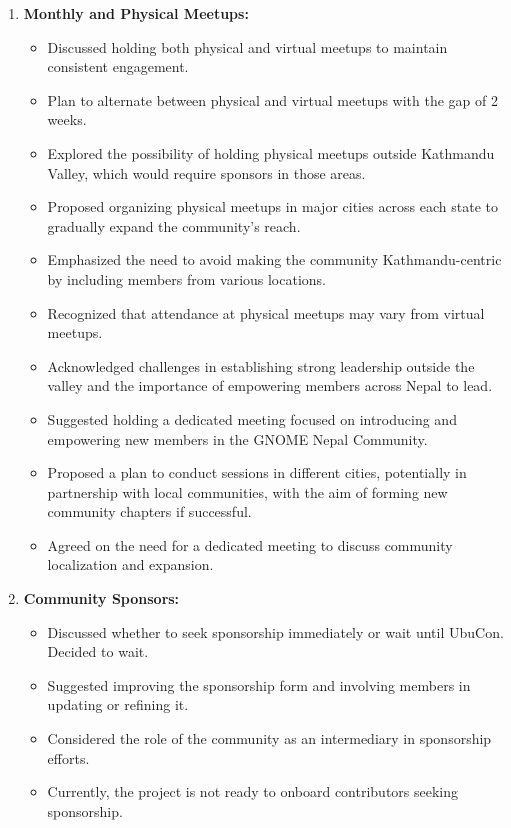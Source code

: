 \documentclass[a4paper,11pt]{article}
\begin{document}
\begin{enumerate}[label=\arabic*.]
    \item \textbf{Monthly and Physical Meetups:} \\
    \begin{itemize}
        \item Discussed holding both physical and virtual meetups to maintain consistent engagement.
        \item Plan to alternate between physical and virtual meetups with the gap of 2 weeks.
        \item Explored the possibility of holding physical meetups outside Kathmandu Valley, which would require sponsors in those areas.
        \item Proposed organizing physical meetups in major cities across each state to gradually expand the community’s reach.
        \item Emphasized the need to avoid making the community Kathmandu-centric by including members from various locations.
        \item Recognized that attendance at physical meetups may vary from virtual meetups.
        \item Acknowledged challenges in establishing strong leadership outside the valley and the importance of empowering members across Nepal to lead.
        \item Suggested holding a dedicated meeting focused on introducing and empowering new members in the GNOME Nepal Community.
        \item Proposed a plan to conduct sessions in different cities, potentially in partnership with local communities, with the aim of forming new community chapters if successful.
        \item Agreed on the need for a dedicated meeting to discuss community localization and expansion.
    \end{itemize}

    \item \textbf{Community Sponsors:} \\
    \begin{itemize}
        \item Discussed whether to seek sponsorship immediately or wait until UbuCon. Decided to wait.
        \item Suggested improving the sponsorship form and involving members in updating or refining it.
        \item Considered the role of the community as an intermediary in sponsorship efforts.
        \item Currently, the project is not ready to onboard contributors seeking sponsorship.
    \end{itemize}


\end{enumerate}
\end{document}

